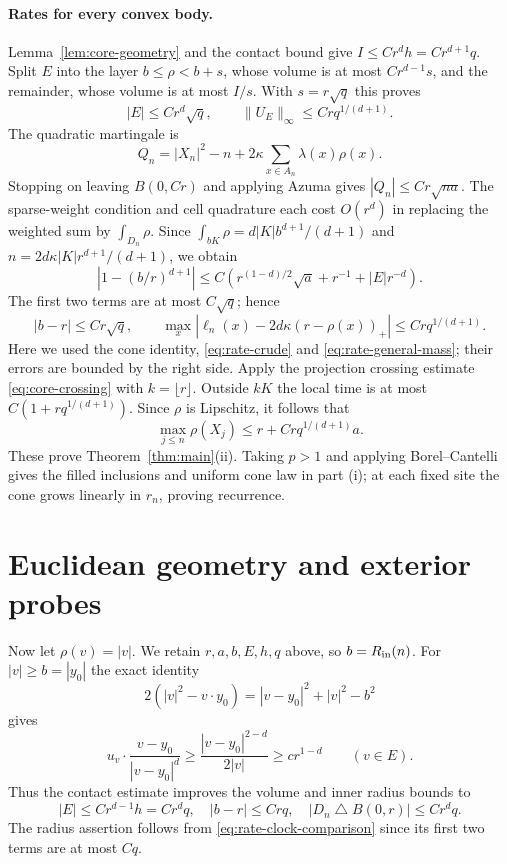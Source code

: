 \paragraph{Rates for every convex body.}
Lemma~\ref{lem:core-geometry} and the contact bound give
$I\le Cr^d h=Cr^{d+1}q$. Split $E$ into the layer
$b\le\rho<b+s$, whose volume is at most $Cr^{d-1}s$, and the remainder,
whose volume is at most $I/s$. With $s=r\sqrt q$ this proves
\begin{equation}\label{eq:rate-general-mass}
 |E|\le Cr^d\sqrt q,\qquad
 \|U_E\|_\infty\le Crq^{1/(d+1)}.
\end{equation}
The quadratic martingale is
\[
 Q_n=|X_n|^2-n+2\kappa\sum_{x\in A_n}\lambda(x)\rho(x).
\]
Stopping on leaving $B(0,Cr)$ and applying Azuma gives
$|Q_n|\le Cr\sqrt{na}$. The sparse-weight condition and cell quadrature
each cost $O(r^d)$ in replacing the weighted sum by $\int_{D_n}\rho$.
Since $\int_{bK}\rho=d|K|b^{d+1}/(d+1)$ and
$n=2d\kappa|K|r^{d+1}/(d+1)$, we obtain
\begin{equation}\label{eq:rate-clock-comparison}
 \left|1-(b/r)^{d+1}\right|
 \le C\left(r^{(1-d)/2}\sqrt a+r^{-1}+|E|r^{-d}\right).
\end{equation}
The first two terms are at most $C\sqrt q$; hence
\begin{equation}\label{eq:rate-general-conclusion}
 |b-r|\le Cr\sqrt q,\qquad
 \max_x|\ell_n(x)-2d\kappa(r-\rho(x))_+|
 \le Crq^{1/(d+1)}.
\end{equation}
Here we used the cone identity, \eqref{eq:rate-crude} and
\eqref{eq:rate-general-mass}; their errors are bounded by the right side.
Apply the projection crossing estimate \eqref{eq:core-crossing} with
$k=\lfloor r\rfloor$. Outside $kK$ the local time is at most
$C(1+rq^{1/(d+1)})$. Since $\rho$ is Lipschitz, it follows that
\begin{equation}\label{eq:rate-general-outer}
 \max_{j\le n}\rho(X_j)\le r+Crq^{1/(d+1)}a.
\end{equation}
These prove Theorem~\ref{thm:main}\textup{(ii)}. Taking $p>1$ and
applying Borel--Cantelli gives the filled inclusions and uniform cone
law in part \textup{(i)}; at each fixed site the cone grows linearly in
$r_n$, proving recurrence.

\section{Euclidean geometry and exterior probes}
Now let $\rho(v)=|v|$. We retain $r,a,b,E,h,q$ above, so $b=R_{\rm in}(n)$.
For $|v|\ge b=|y_0|$ the exact identity
\[
 2(|v|^2-v\cdot y_0)=|v-y_0|^2+|v|^2-b^2
\]
gives
\[
 u_v\cdot\frac{v-y_0}{|v-y_0|^d}
 \ge\frac{|v-y_0|^{2-d}}{2|v|}\ge c r^{1-d}
 \qquad(v\in E).
\]
Thus the contact estimate improves the volume and inner radius bounds to
\begin{equation}\label{eq:rate-euclidean-inner}
 |E|\le Cr^{d-1}h=Cr^dq,\quad |b-r|\le Crq,
 \quad |D_n\mathbin\triangle B(0,r)|\le Cr^dq.
\end{equation}
The radius assertion follows from \eqref{eq:rate-clock-comparison} since
its first two terms are at most $Cq$.

